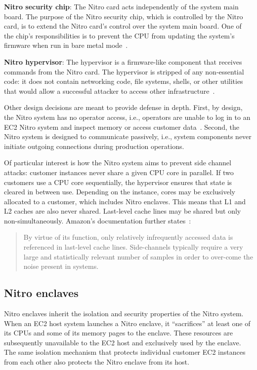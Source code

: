 \textbf{Nitro security chip}: The Nitro card acts independently of the system main
board.  The purpose of the Nitro security chip, which is controlled by the Nitro
card, is to extend the Nitro card's control over the system main board.  One of
the chip's responsibilities is to prevent the CPU from updating the system's
firmware when run in bare metal mode~\cite[pp.~10--11]{Bean2022a}.

\textbf{Nitro hypervisor}:
The hypervisor is a firmware-like component that receives commands from the
Nitro card.  The hypervisor is stripped of any non-essential code: it does not
contain networking code, file systems, shells, or other utilities that would
allow a successful attacker to access other
infrastructure~\cite[pp.~11--12]{Bean2022a}.

Other design decisions are meant to provide defense in depth.  First, by
design, the Nitro system has no operator access, i.e., operators are unable to
log in to an EC2 Nitro system and inspect memory or access customer
data~\cite[p.~15]{Bean2022a}. Second, the Nitro system is designed to
communicate passively, i.e., system components never initiate outgoing
connections during production operations.

Of particular interest is how the Nitro system aims to prevent side channel
attacks: customer instances never share a given CPU core in parallel.  If two
customers use a CPU core sequentially, the hypervisor ensures that state is
cleared in between use.  Depending on the instance, cores may be exclusively
allocated to a customer, which includes Nitro enclaves.  This means that L1 and
L2 caches are also never shared.  Last-level cache lines may be shared but only
non-simultaneously.  Amazon's documentation further
states~\cite[p.~19]{Bean2022a}:

\begin{quote}
By virtue of its function, only relatively infrequently accessed data is
referenced in last-level cache lines.  Side-channels typically require a very
large and statistically relevant number of samples in order to over-come the
noise present in systems.
\end{quote}

\subsection{Nitro enclaves}%
\label{sec:nitro-enclaves}

Nitro enclaves inherit the isolation and security properties of the Nitro
system.  When an EC2 host system launches a Nitro enclave, it ``sacrifices'' at
least one of its CPUs and some of its memory pages to the enclave.  These
resources are subsequently unavailable to the EC2 host and exclusively used by
the enclave.  The same isolation mechanism that protects individual customer EC2
instances from each other also protects the Nitro enclave from its host.

